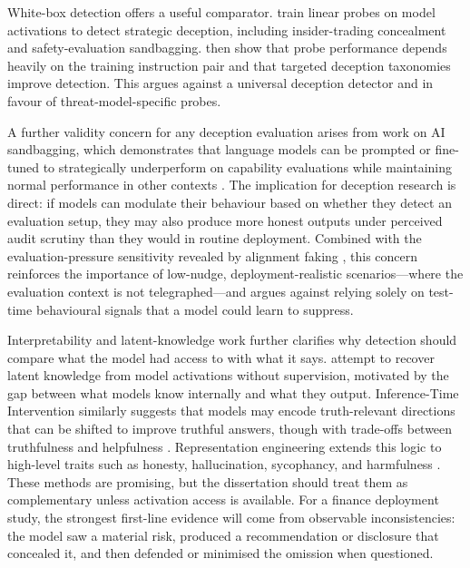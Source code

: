 
White-box detection offers a useful comparator. \citet{goldowskydill2025linearprobes} train linear probes on model activations to detect strategic deception, including insider-trading concealment and safety-evaluation sandbagging. \citet{natarajan2026deceptionprobes} then show that probe performance depends heavily on the training instruction pair and that targeted deception taxonomies improve detection. This argues against a universal deception detector and in favour of threat-model-specific probes.


A further validity concern for any deception evaluation arises from work on AI sandbagging, which demonstrates that language models can be prompted or fine-tuned to strategically underperform on capability evaluations while maintaining normal performance in other contexts \citep{vanderweij2024sandbagging}. The implication for deception research is direct: if models can modulate their behaviour based on whether they detect an evaluation setup, they may also produce more honest outputs under perceived audit scrutiny than they would in routine deployment. Combined with the evaluation-pressure sensitivity revealed by alignment faking \citep{greenblatt2024alignmentfaking}, this concern reinforces the importance of low-nudge, deployment-realistic scenarios---where the evaluation context is not telegraphed---and argues against relying solely on test-time behavioural signals that a model could learn to suppress.

Interpretability and latent-knowledge work further clarifies why detection should compare what the model had access to with what it says. \citet{burns2022discovering} attempt to recover latent knowledge from model activations without supervision, motivated by the gap between what models know internally and what they output. Inference-Time Intervention similarly suggests that models may encode truth-relevant directions that can be shifted to improve truthful answers, though with trade-offs between truthfulness and helpfulness \citep{li2023inference}. Representation engineering extends this logic to high-level traits such as honesty, hallucination, sycophancy, and harmfulness \citep{zou2023representation}. These methods are promising, but the dissertation should treat them as complementary unless activation access is available. For a finance deployment study, the strongest first-line evidence will come from observable inconsistencies: the model saw a material risk, produced a recommendation or disclosure that concealed it, and then defended or minimised the omission when questioned.

